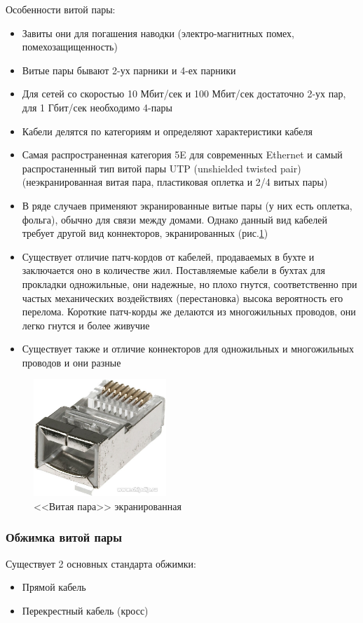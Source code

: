 \documentclass[a4paper]{article}
\begin{document}
Особенности витой пары:
\begin{itemize}
	\item Завиты они для погашения наводки (электро-магнитных помех, помехозащищенность)
	\item Витые пары бывают 2-ух парники и 4-ех парники
	\item Для сетей со скоростью 10 Мбит/сек и 100 Мбит/сек достаточно 2-ух пар, для 1 Гбит/сек необходимо 4-пары
	\item Кабели делятся по категориям и определяют характеристики кабеля
	\item Самая распространенная категория 5E для современных Ethernet и самый распростаненный тип витой пары UTP (unshielded twisted pair)(неэкранированная витая пара, пластиковая оплетка и 2/4 витых пары)
	\item В ряде случаев применяют экранированные витые пары (у них есть оплетка, фольга), обычно для связи между домами. Однако данный вид кабелей требует другой вид коннекторов, экранированных (рис.\ref{fig:pic-20-ethernet-rj-45-ftp})
	\item Существует отличие патч-кордов от кабелей, продаваемых в бухте и заключается оно в количестве жил. Поставляемые кабели в бухтах для прокладки одножильные, они надежные, но плохо гнутся, соответственно при частых механических воздействиях (перестановка) высока вероятность его перелома. Короткие патч-корды же делаются из многожильных проводов, они легко гнутся и более живучие
	\item Существует также и отличие коннекторов для одножильных и многожильных проводов и они разные 
\end{itemize}

\begin{figure}[!h]
	\centering
	\includegraphics[width=5cm]{20-ethernet-rj-45-ftp}
	\caption{<<Витая пара>> экранированная}
	\label{fig:pic-20-ethernet-rj-45-ftp}
\end{figure}

\subsubsection{Обжимка витой пары}
Существует 2 основных стандарта обжимки:
\begin{itemize}
	\item Прямой кабель
	\item Перекрестный кабель (кросс)
\end{itemize}
\end{document}
